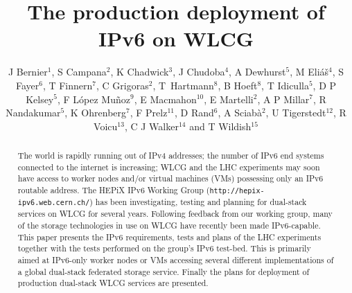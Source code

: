 \documentclass[a4paper]{jpconf}
\begin{document}
\title{The production deployment of IPv6 on WLCG}

\author{J Bernier$^1$, S Campana$^2$, K Chadwick$^3$, J Chudoba$^4$, 
        A Dewhurst$^5$, M Eli\'a\v s$^4$, S Fayer$^6$, T Finnern$^7$,
        C Grigoras$^2$, T~Hartmann$^8$, B Hoeft$^8$, T Idiculla$^5$, D P Kelsey$^5$,  
        F L\'opez Mu\~noz$^9$, E Macmahon$^{10}$, E Martelli$^2$, A P Millar$^7$, R Nandakumar$^5$, 
        K Ohrenberg$^7$, F Prelz$^{11}$, D Rand$^6$, 
        A Sciab\`a$^2$, U Tigerstedt$^{12}$, R Voicu$^{13}$, 
        C J Walker$^{14}$ and T Wildish$^{15}$}

\address{$^1$ IN2P3 Computing Centre, Boulevard du 11 Novembre 1918, F-69622 Villeurbanne Cedex, France}
\address{$^2$ CERN, CH-1211 Gen\`eve 23, Switzerland}
\address{$^3$ Fermi National Accelerator Laboratory, Batavia, Il 60510, U.S.A.}
\address{$^4$ Institute of Physics, Academy of Sciences of the Czech Republic Na Slovance 2 182 21 Prague 8, Czech Republic}
\address{$^5$ STFC Rutherford Appleton Laboratory, Harwell Oxford, Didcot, Oxfordshire OX11 0QX, United Kingdom}
\address{$^6$ Imperial College London, South Kensington Campus, London SW7 2AZ, United Kingdom}
\address{$^7$ Deutsches Elektronen-Synchrotron, Notkestra\ss e 85, D-22607 Hamburg, Germany}
\address{$^8$ Karlsruher Institut f\"ur Technologie, Hermann-von-Helmholtz-Platz 1, D-76344 Eggenstein-Leopoldshafen, Germany}
\address{$^9$ Port d'Informaci\'o Cient\'ifica, Campus UAB, Edifici D, E-08193 Bellaterra, Spain}
\address{$^{10}$ The University of Oxford, Denys Wilkinson Building, Keble Road, Oxford OX1 3RH, United Kingdom}
\address{$^{11}$ INFN, Sezione di Milano, via G. Celoria 16, I-20133 Milano, Italy}
\address{$^{12}$ CSC Tieteen Tietotekniikan Keskus Oy, P.O. Box 405, FI-02101 Espoo, Finland}
\address{$^{13}$ California Institute of Technology, Pasadena, Ca 91125, U.S.A.}
\address{$^{14}$ Queen Mary University of London, Mile End Road, London E1 4NS, United Kingdom}
\address{$^{15}$ Princeton University, Jadwin Hall, Princeton, NJ 08544, U.S.A.}


\begin{abstract}
The world is rapidly running out of IPv4 addresses; the number of IPv6 end systems connected
to the internet is increasing; WLCG and the LHC experiments may soon have access to worker
nodes and/or virtual machines (VMs) possessing only an IPv6 routable address. The HEPiX
IPv6 Working Group ({\tt http://hepix-ipv6.web.cern.ch/}) has been investigating, testing and
planning for dual-stack services on WLCG for several years. Following feedback from our
working group, many of the storage technologies in use on WLCG have recently been made
IPv6-capable.
This paper presents the IPv6 requirements, tests and plans of the LHC
experiments together with the tests performed on the group's IPv6 test-bed. 
This is primarily aimed at IPv6-only worker nodes or VMs
accessing several different implementations of a global dual-stack federated storage service.
Finally the plans for deployment of production dual-stack WLCG services are presented.
\end{abstract}
\end{document}
